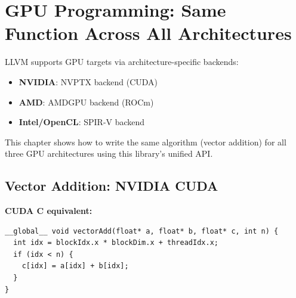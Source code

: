 \documentclass[11pt,oneside]{book}
\begin{document}
\chapter{GPU Programming: Same Function Across All Architectures}

LLVM supports GPU targets via architecture-specific backends:
\begin{itemize}[noitemsep]
  \item \textbf{NVIDIA}: NVPTX backend (CUDA)
  \item \textbf{AMD}: AMDGPU backend (ROCm)
  \item \textbf{Intel/OpenCL}: SPIR-V backend
\end{itemize}

This chapter shows how to write the same algorithm (vector addition) for all three GPU architectures using this library's unified API.

\section{Vector Addition: NVIDIA CUDA}

\textbf{CUDA C equivalent:}
\begin{lstlisting}[style=ir]
__global__ void vectorAdd(float* a, float* b, float* c, int n) {
  int idx = blockIdx.x * blockDim.x + threadIdx.x;
  if (idx < n) {
    c[idx] = a[idx] + b[idx];
  }
}
\end{lstlisting}
\end{document}
